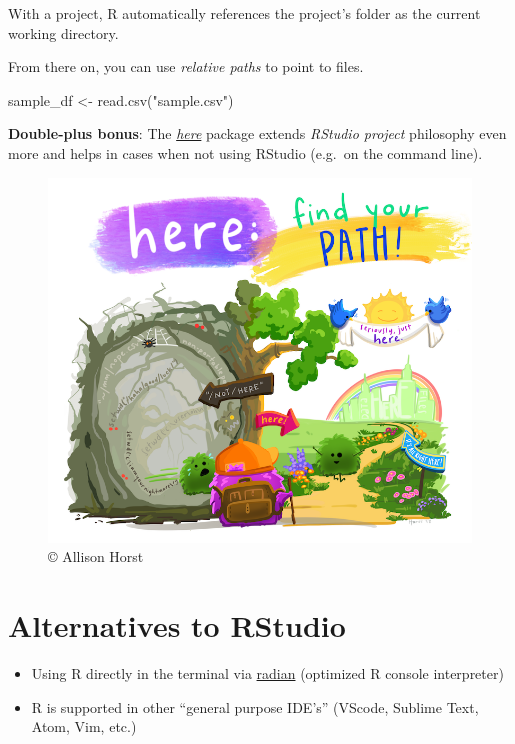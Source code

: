 \documentclass[]{book}
\newenvironment{Shaded}{}{}
\newcommand{\KeywordTok}[1]{\textcolor[rgb]{0.00,0.00,1.00}{#1}}
\newcommand{\NormalTok}[1]{#1}
\newcommand{\StringTok}[1]{\textcolor[rgb]{0.00,0.50,0.50}{#1}}
\begin{document}
With a project, R automatically references the project's folder as the current working directory.

From there on, you can use \emph{relative paths} to point to files.

\begin{Shaded}
\begin{Highlighting}[]
\NormalTok{sample_df <-}\StringTok{ }\KeywordTok{read.csv}\NormalTok{(}\StringTok{"sample.csv"}\NormalTok{)}
\end{Highlighting}
\end{Shaded}

\textbf{Double-plus bonus}: The \href{https://github.com/r-lib/here}{\emph{here}} package extends \emph{RStudio project} philosophy even more and helps in cases when not using RStudio (e.g.~on the command line).

\begin{figure}

\hfill{}\includegraphics[width=11.11in]{img/here} 

\caption{© Allison Horst}\label{fig:unnamed-chunk-5}
\end{figure}

\hypertarget{alternatives-to-rstudio}{%
\section{Alternatives to RStudio}\label{alternatives-to-rstudio}}

\begin{itemize}
\item
  Using R directly in the terminal via \href{https://github.com/randy3k/radian}{radian} (optimized R console interpreter)
\item
  R is supported in other ``general purpose IDE's'' (VScode, Sublime Text, Atom, Vim, etc.)
\end{itemize}
\end{document}
